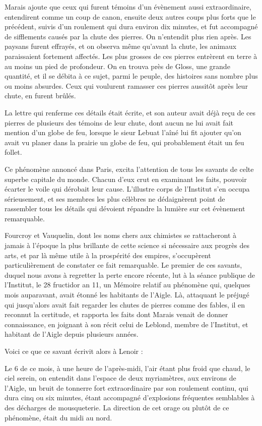\documentclass[a4paper, 12pt, oneside, french]{article}
\begin{document}
Marais ajoute que ceux qui furent témoins d'un évènement aussi extraordinaire, entendirent comme un coup de canon, ensuite deux autres coups plus forts que le précédent, suivis d'un roulement qui dura environ dix minutes, et fut accompagné de sifflements causés par la chute des pierres. On n'entendit plus rien après. Les paysans furent effrayés, et on observa même qu'avant la chute, les animaux paraissaient fortement affectés. Les plus grosses de ces pierres entrèrent en terre à au moins un pied de profondeur. On en trouva près de Gloss, une grande quantité, et il se débita à ce sujet, parmi le peuple, des histoires sans nombre plus ou moins absurdes. Ceux qui voulurent ramasser ces pierres aussitôt après leur chute, en furent brûlés.

La lettre qui renferme ces détails était écrite, et son auteur avait déjà reçu de ces pierres de plusieurs des témoins de leur chute, dont aucun ne lui avait fait mention d'un globe de feu, lorsque le sieur Lebuat l'aîné lui fit ajouter qu'on avait vu planer dans la prairie un globe de feu, qui probablement était un feu follet.

Ce phénomène annoncé dans Paris, excita l'attention de tous les savants de celte superbe capitale du monde. Chacun d'eux crut en examinant les faits, pouvoir écarter le voile qui dérobait leur cause. L'illustre corps de l'Institut s'en occupa sérieusement, et ses membres les plus célèbres ne dédaignèrent point de rassembler tous les détails qui dévoient répandre la lumière sur cet évènement remarquable.

Fourcroy et Vauquelin, dont les noms chers aux chimistes se rattacheront à jamais à l'époque la plus brillante de cette science si nécessaire aux progrès des arts, et par là même utile à la prospérité des empires, s'occupèrent particulièrement de constater ce fait remarquable. Le premier de ces savants, duquel nous avons à regretter la perte encore récente, lut à la séance publique de l'Institut, le 28 fructidor an 11, un Mémoire relatif au phénomène qui, quelques mois auparavant, avait étonné les habitants de l'Aigle. Là, attaquant le préjugé qui jusqu'alors avait fait regarder les chutes de pierres comme des fables, il en reconnut la certitude, et rapporta les faits dont Marais venait de donner connaissance, en joignant à son récit celui de Leblond, membre de l'Institut, et habitant de l'Aigle depuis plusieurs années.

Voici ce que ce savant écrivit alors à Lenoir :

\og Le 6 de ce mois, à une heure de l'après-midi, l'air étant plus froid que chaud, le ciel serein, on entendit dans l'espace de deux myriamètres, aux environs de l'Aigle, un bruit de tonnerre fort extraordinaire par son roulement continu, qui dura cinq ou six minutes, étant accompagné d'explosions fréquentes semblables à des décharges de mousqueterie. La direction de cet orage ou plutôt de ce phénomène, était du midi au nord. \fg
\end{document}
